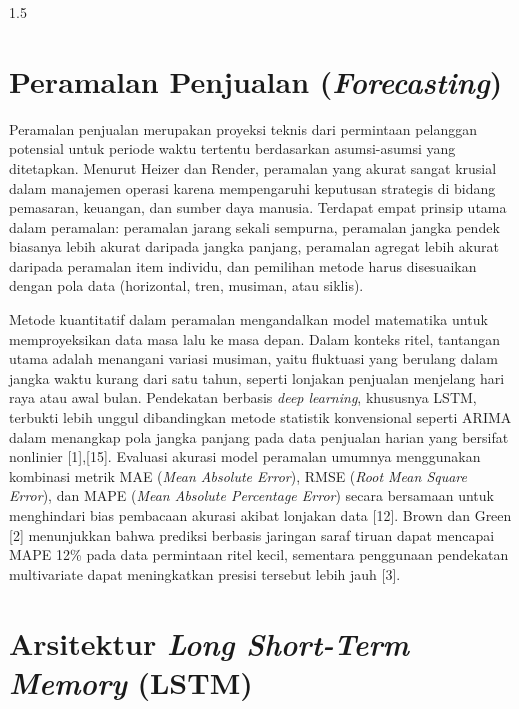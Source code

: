 \documentclass[12pt, a4paper, onecolumn, oneside]{report}
\begin{document}
\begin{spacing}{1.5}
\section{Peramalan Penjualan (\textit{Forecasting})}

Peramalan penjualan merupakan proyeksi teknis dari permintaan pelanggan potensial untuk periode waktu tertentu berdasarkan asumsi-asumsi yang ditetapkan. Menurut Heizer dan Render, peramalan yang akurat sangat krusial dalam manajemen operasi karena mempengaruhi keputusan strategis di bidang pemasaran, keuangan, dan sumber daya manusia. Terdapat empat prinsip utama dalam peramalan: peramalan jarang sekali sempurna, peramalan jangka pendek biasanya lebih akurat daripada jangka panjang, peramalan agregat lebih akurat daripada peramalan item individu, dan pemilihan metode harus disesuaikan dengan pola data (horizontal, tren, musiman, atau siklis).

Metode kuantitatif dalam peramalan mengandalkan model matematika untuk memproyeksikan data masa lalu ke masa depan. Dalam konteks ritel, tantangan utama adalah menangani variasi musiman, yaitu fluktuasi yang berulang dalam jangka waktu kurang dari satu tahun, seperti lonjakan penjualan menjelang hari raya atau awal bulan. Pendekatan berbasis \textit{deep learning}, khususnya LSTM, terbukti lebih unggul dibandingkan metode statistik konvensional seperti ARIMA dalam menangkap pola jangka panjang pada data penjualan harian yang bersifat nonlinier [1],[15]. Evaluasi akurasi model peramalan umumnya menggunakan kombinasi metrik MAE (\textit{Mean Absolute Error}), RMSE (\textit{Root Mean Square Error}), dan MAPE (\textit{Mean Absolute Percentage Error}) secara bersamaan untuk menghindari bias pembacaan akurasi akibat lonjakan data [12]. Brown dan Green [2] menunjukkan bahwa prediksi berbasis jaringan saraf tiruan dapat mencapai MAPE 12\% pada data permintaan ritel kecil, sementara penggunaan pendekatan multivariate dapat meningkatkan presisi tersebut lebih jauh [3].

\section{Arsitektur \textit{Long Short-Term Memory} (LSTM)}


\end{spacing}
\end{document}
